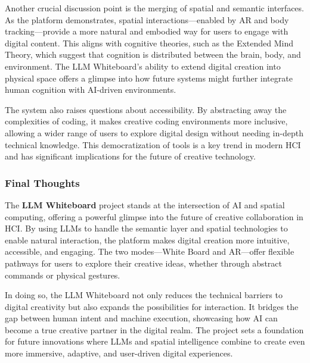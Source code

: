 Another crucial discussion point is the merging of spatial and semantic interfaces.
As the platform demonstrates, spatial interactions—enabled by AR and body tracking—provide a more natural and embodied way for users to engage with digital content.
This aligns with cognitive theories, such as the Extended Mind Theory, which suggest that cognition is distributed between the brain, body, and environment.
The LLM Whiteboard’s ability to extend digital creation into physical space offers a glimpse into how future systems might further integrate human cognition with AI-driven environments.

The system also raises questions about accessibility.
By abstracting away the complexities of coding, it makes creative coding environments more inclusive, allowing a wider range of users to explore digital design without needing in-depth technical knowledge.
This democratization of tools is a key trend in modern HCI and has significant implications for the future of creative technology.

\subsubsection{Final Thoughts}

The \textbf{LLM Whiteboard} project stands at the intersection of AI and spatial computing, offering a powerful glimpse into the future of creative collaboration in HCI.
By using LLMs to handle the semantic layer and spatial technologies to enable natural interaction, the platform makes digital creation more intuitive, accessible, and engaging.
The two modes—White Board and AR—offer flexible pathways for users to explore their creative ideas, whether through abstract commands or physical gestures.

In doing so, the LLM Whiteboard not only reduces the technical barriers to digital creativity but also expands the possibilities for interaction.
It bridges the gap between human intent and machine execution, showcasing how AI can become a true creative partner in the digital realm.
The project sets a foundation for future innovations where LLMs and spatial intelligence combine to create even more immersive, adaptive, and user-driven digital experiences.
